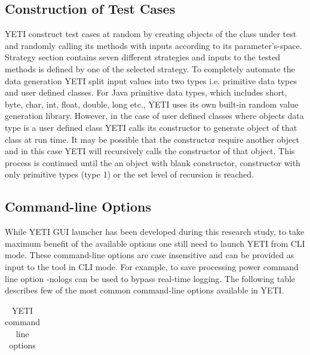 \begin{enumerate}
\subsection{Construction of Test Cases}
YETI construct test cases at random by creating objects of the class under test and randomly calling its methods with inputs according to its parameter's-space. Strategy section contains seven different strategies and inputs to the tested methods is defined by one of the selected strategy. To completely automate the data generation YETI   split input values into two types i.e. primitive data types and user defined classes. For Java primitive data types, which includes short, byte, char, int, float, double, long etc., YETI uses its own built-in random value generation library. However, in the case of user defined classes where objects data type is a user defined class YETI calls its constructor to generate object of that class at run time. It may be possible that the constructor require another object and in this case YETI will recursively calls the constructor of that object. This process is continued until the an object with blank constructor, constructor with only primitive types (type 1) or the set level of recursion is reached. 

\subsection{Command-line Options}
While YETI GUI launcher has been developed during this research study, to take maximum benefit of the available options one still need to launch YETI from CLI mode. These command-line options are case insensitive and can be provided as input to the tool in CLI mode. For example, to save processing power command line option -nologs can be used to bypass real-time logging. The following table describes few of the most common command-line options available in YETI.    

\begin{table}[h]
\caption{YETI command line options} %
\smallskip
\centering %
\begin{tabular}{ll } %
\hline


\end{tabular}
\end{table}
\end{enumerate}
